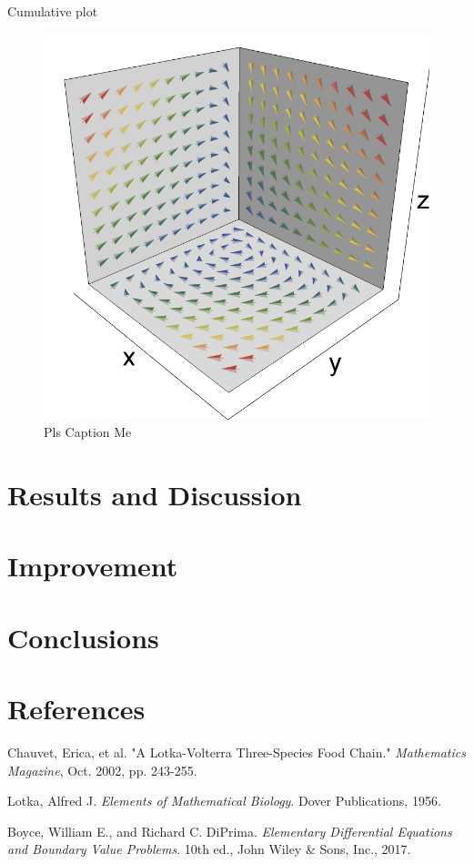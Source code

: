 \documentclass[11pt,oneside]{article}
\begin{document}
	Cumulative plot
	\begin{figure}[H]
		\center
		\includegraphics[scale=0.80]{XYZ}
		\caption{Pls Caption Me}
	\end{figure}
	
	
	\section{Results and Discussion}
	
	\section{Improvement}
	
	\section{Conclusions}
	
	\section{References}
	\begin{hangparas}{.25in}{1}
		Chauvet, Erica, et al. "A Lotka-Volterra Three-Species Food Chain." \textit{Mathematics Magazine}, Oct. 2002, pp. 243-255.
		
		Lotka, Alfred J. \textit{Elements of Mathematical Biology}. Dover Publications, 1956.
		
		Boyce, William E., and Richard C. DiPrima. \textit{Elementary Differential Equations and Boundary Value Problems}. 10th ed., John Wiley \& Sons, Inc., 2017.
		
		
	\end{hangparas}
	
\end{document}
